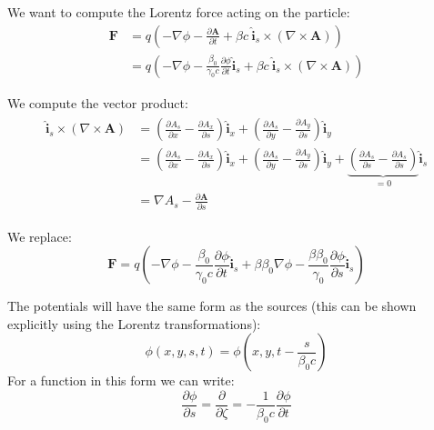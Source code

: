 \documentclass[a4paper,12pt]{report}
\begin{document}
We want to compute the Lorentz force acting on the particle:
\begin{equation}
\begin{split}
\textbf{F} &=q \left( -\nabla \phi -\frac{\partial \textbf{A}}{\partial t}
 + \beta c \ \hat{\textbf{i}}_s \times {\left(\nabla \times \textbf{A} \right)} \right)\\
 &=q \left( -\nabla \phi -\frac{\beta_0}{\gamma_0 c}\frac{\partial \phi}{\partial t}\hat{\textbf{i}}_s
 + \beta c \ \hat{\textbf{i}}_s \times {\left(\nabla \times \textbf{A} \right)} \right)
 \end{split}
\end{equation}

We compute the vector product:
\begin{align}
\begin{split}
\hat{\textbf{i}}_s \times \left(\nabla \times \textbf{A}\right) &= \left(\frac{\partial A_s}{\partial x} - \frac{\partial A_x}{\partial s} \right) \hat{\textbf{i}}_x + \left(\frac{\partial A_s}{\partial y} - \frac{\partial A_y}{\partial s} \right) \hat{\textbf{i}}_y\\
 &= \left(\frac{\partial A_s}{\partial x} - \frac{\partial A_x}{\partial s} \right) \hat{\textbf{i}}_x + \left(\frac{\partial A_s}{\partial y} - \frac{\partial A_y}{\partial s} \right) \hat{\textbf{i}}_y + \underbrace{\left(\frac{\partial A_s}{\partial s} - \frac{\partial A_s}{\partial s} \right)}_{=0} \hat{\textbf{i}}_s\\
 &= \nabla A_s - \frac{\partial \textbf{A}}{\partial s} 
\end{split} 
\end{align}

We replace:
\begin{equation}
\textbf{F} 
=q \left( -\nabla \phi -\frac{\beta_0}{\gamma_0 c}\frac{\partial \phi}{\partial t}\hat{\textbf{i}}_s
 + \beta  \beta_0\nabla \phi - \frac{\beta \beta_0}{\gamma_0} \frac{\partial \phi}{\partial s} \hat{\textbf{i}}_s
  \right)
\end{equation}

The potentials will have the same form as the sources (this can be shown explicitly using the Lorentz transformations):
\begin{equation}
\phi(x, y, s, t) = \phi\left(x, y, t - \frac{s}{\beta_0 c}\right)
\end{equation}
For a function in this form we can write:
\begin{equation}
 \frac{\partial \phi}{\partial s} = 
\frac{\partial}{\partial\zeta} 
 = -\frac{1}{\beta_0 c}\frac{\partial \phi}{\partial t} \label{derder}
\end{equation}
\end{document}
